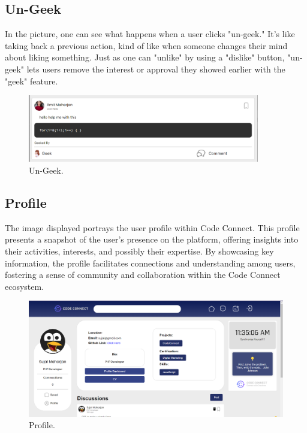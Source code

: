 \subsection{Un-Geek}
In the picture, one can see what happens when a user clicks "un-geek." It's like taking back a previous action, kind of like when someone changes their mind about liking something. Just as one can "unlike" by using a "dislike" button, "un-geek" lets users remove the interest or approval they showed earlier with the "geek" feature.
\begin{figure}[H]
    \centering
    \includegraphics[width=0.9\textwidth]{Outcome-ss/ungeek.png}
    \caption{Un-Geek.}
    \label{fig:Un-Geek}
\end{figure}

\subsection{Profile}
The image displayed portrays the user profile within Code Connect. This profile presents a snapshot of the user's presence on the platform, offering insights into their activities, interests, and possibly their expertise. By showcasing key information, the profile facilitates connections and understanding among users, fostering a sense of community and collaboration within the Code Connect ecosystem.
\begin{figure}[H]
    \centering
    \includegraphics[width=1\textwidth]{Outcome-ss/self-profile.png}
    \caption{Profile.}
    \label{fig:Profile}
\end{figure}

